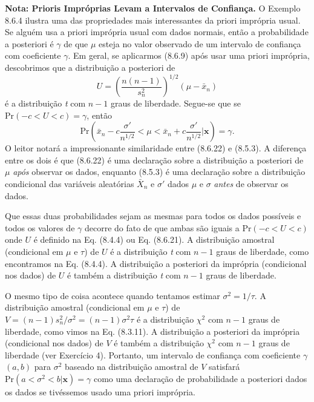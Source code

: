 \noindent\textbf{Nota: Prioris Impróprias Levam a Intervalos de Confiança.} O Exemplo 8.6.4 ilustra uma das propriedades mais interessantes da priori imprópria usual. Se alguém usa a priori imprópria usual com dados normais, então a probabilidade a posteriori é $\gamma$ de que $\mu$ esteja no valor observado de um intervalo de confiança com coeficiente $\gamma$. Em geral, se aplicarmos (8.6.9) após usar uma priori imprópria, descobrimos que a distribuição a posteriori de
\begin{equation} \label{eq:8.6.21}
    U = \left(\frac{n(n-1)}{s_n^2}\right)^{1/2} (\mu - \bar{x}_n)
\end{equation}
é a distribuição \textit{t} com $n-1$ graus de liberdade. Segue-se que se $\text{Pr}(-c < U < c) = \gamma$, então
\begin{equation} \label{eq:8.6.22}
    \text{Pr}\left(\bar{x}_n - c\frac{\sigma'}{n^{1/2}} < \mu < \bar{x}_n + c\frac{\sigma'}{n^{1/2}} \bigg| \mathbf{x}\right) = \gamma.
\end{equation}
O leitor notará a impressionante similaridade entre (8.6.22) e (8.5.3). A diferença entre os dois é que (8.6.22) é uma declaração sobre a distribuição a posteriori de $\mu$ \textit{após} observar os dados, enquanto (8.5.3) é uma declaração sobre a distribuição condicional das variáveis aleatórias $\bar{X}_n$ e $\sigma'$ dados $\mu$ e $\sigma$ \textit{antes} de observar os dados.

Que essas duas probabilidades sejam as mesmas para todos os dados possíveis e todos os valores de $\gamma$ decorre do fato de que ambas são iguais a $\text{Pr}(-c < U < c)$ onde $U$ é definido na Eq. (8.4.4) ou Eq. (8.6.21). A distribuição amostral (condicional em $\mu$ e $\tau$) de $U$ é a distribuição \textit{t} com $n-1$ graus de liberdade, como encontramos na Eq. (8.4.4). A distribuição a posteriori da imprópria (condicional nos dados) de $U$ é também a distribuição \textit{t} com $n-1$ graus de liberdade.

O mesmo tipo de coisa acontece quando tentamos estimar $\sigma^2 = 1/\tau$. A distribuição amostral (condicional em $\mu$ e $\tau$) de $V = (n-1)s_n^2/\sigma^2 = (n-1)\sigma^2\tau$ é a distribuição $\chi^2$ com $n-1$ graus de liberdade, como vimos na Eq. (8.3.11). A distribuição a posteriori da imprópria (condicional nos dados) de $V$ é também a distribuição $\chi^2$ com $n-1$ graus de liberdade (ver Exercício 4). Portanto, um intervalo de confiança com coeficiente $\gamma$ $(a, b)$ para $\sigma^2$ baseado na distribuição amostral de $V$ satisfará $\text{Pr}(a < \sigma^2 < b|\mathbf{x}) = \gamma$ como uma declaração de probabilidade a posteriori dados os dados se tivéssemos usado uma priori imprópria.

